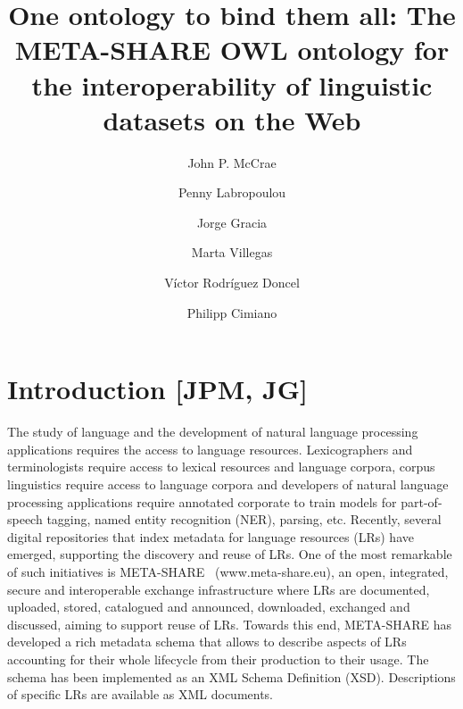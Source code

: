 \documentclass{llncs}
\begin{document}
\title{One ontology to bind them all: The META-SHARE OWL ontology for the interoperability of linguistic datasets on the Web}
%
%
\author{John P. McCrae \and Penny Labropoulou \and Jorge
    Gracia \and Marta Villegas \and V\'ictor Rodr\'iguez
Doncel \and Philipp Cimiano}
%
%
%
\maketitle %
\begin{abstract}
\end{abstract}


\section{Introduction [JPM, JG]}
\label{sec:introduction}

The study of language and the development of natural language processing applications requires the access to language resources. Lexicographers and terminologists require access to lexical resources and language corpora, corpus linguistics require access to language corpora and developers of natural language processing applications require annotated corporate to train models for part-of-speech tagging, named entity recognition (NER), parsing, etc. 
Recently, several digital repositories that index metadata for language resources (LRs) have emerged, supporting the discovery and reuse of LRs. One of the most remarkable of such initiatives is META-SHARE~\cite{piperidis2012meta} (www.meta-share.eu), an open, integrated, secure and interoperable exchange infrastructure where LRs are documented, uploaded, stored, catalogued and announced, downloaded, exchanged and discussed, aiming to support reuse of LRs. Towards this end, META-SHARE has developed a rich metadata schema that allows to describe aspects of LRs accounting for their whole lifecycle from their production to their usage. The schema has been implemented as an XML Schema Definition (XSD). Descriptions of specific LRs are available as XML documents.
\end{document}
